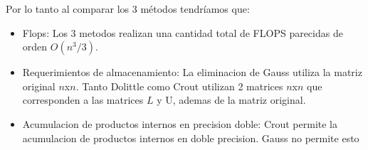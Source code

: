 Por lo tanto al comparar los 3 métodos tendríamos que:

\begin{itemize}
    \item Flops: Los 3 metodos realizan una cantidad total de FLOPS parecidas de orden $O(n^3/3)$.
    \item Requerimientos de almacenamiento: La eliminacion de Gauss utiliza la matriz original $n$x$n$. Tanto Dolittle como Crout utilizan 2 matrices $n$x$n$ que corresponden a las matrices $L$ y U, ademas de la matriz original.
    \item Acumulacion de productos internos en precision doble: Crout permite la acumulacion de productos internos en doble precision. Gauss no permite esto 
    
\end{itemize}